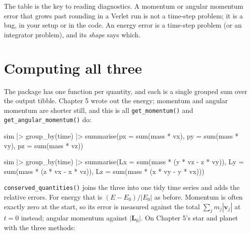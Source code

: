 \documentclass[
  10.5pt,
  letterpaper,
]{scrbook}
\newenvironment{Shaded}{\begin{snugshade}}{\end{snugshade}}
\newcommand{\AttributeTok}[1]{\textcolor[rgb]{0.00,0.00,0.00}{#1}}
\newcommand{\FunctionTok}[1]{\textcolor[rgb]{0.00,0.00,0.00}{#1}}
\newcommand{\NormalTok}[1]{\textcolor[rgb]{0.00,0.00,0.00}{#1}}
\newcommand{\SpecialCharTok}[1]{\textcolor[rgb]{0.00,0.00,0.00}{#1}}
\theoremstyle{definition}
\theoremstyle{plain}
\theoremstyle{remark}
\begin{document}
The table is the key to reading diagnostics. A momentum or angular
momentum error that grows past rounding in a Verlet run is not a
time-step problem; it is a bug, in your setup or in the code. An energy
error is a time-step problem (or an integrator problem), and its
\emph{shape} says which.

\section{Computing all three}\label{computing-all-three}

The package has one function per quantity, and each is a single grouped
sum over the output tibble. Chapter 5 wrote out the energy; momentum and
angular momentum are shorter still, and this is all
\texttt{get\_momentum()} and \texttt{get\_angular\_momentum()} do:

\begin{Shaded}
\begin{Highlighting}[]
\NormalTok{sim }\SpecialCharTok{|\textgreater{}}
  \FunctionTok{group\_by}\NormalTok{(time) }\SpecialCharTok{|\textgreater{}}
  \FunctionTok{summarise}\NormalTok{(}\AttributeTok{px =} \FunctionTok{sum}\NormalTok{(mass }\SpecialCharTok{*}\NormalTok{ vx), }\AttributeTok{py =} \FunctionTok{sum}\NormalTok{(mass }\SpecialCharTok{*}\NormalTok{ vy), }\AttributeTok{pz =} \FunctionTok{sum}\NormalTok{(mass }\SpecialCharTok{*}\NormalTok{ vz))}

\NormalTok{sim }\SpecialCharTok{|\textgreater{}}
  \FunctionTok{group\_by}\NormalTok{(time) }\SpecialCharTok{|\textgreater{}}
  \FunctionTok{summarise}\NormalTok{(}\AttributeTok{Lx =} \FunctionTok{sum}\NormalTok{(mass }\SpecialCharTok{*}\NormalTok{ (y }\SpecialCharTok{*}\NormalTok{ vz }\SpecialCharTok{{-}}\NormalTok{ z }\SpecialCharTok{*}\NormalTok{ vy)),}
            \AttributeTok{Ly =} \FunctionTok{sum}\NormalTok{(mass }\SpecialCharTok{*}\NormalTok{ (z }\SpecialCharTok{*}\NormalTok{ vx }\SpecialCharTok{{-}}\NormalTok{ x }\SpecialCharTok{*}\NormalTok{ vz)),}
            \AttributeTok{Lz =} \FunctionTok{sum}\NormalTok{(mass }\SpecialCharTok{*}\NormalTok{ (x }\SpecialCharTok{*}\NormalTok{ vy }\SpecialCharTok{{-}}\NormalTok{ y }\SpecialCharTok{*}\NormalTok{ vx)))}
\end{Highlighting}
\end{Shaded}

\texttt{conserved\_quantities()} joins the three into one tidy time
series and adds the relative errors. For energy that is
\((E - E_0)/|E_0|\) as before. Momentum is often exactly zero at the
start, so its error is measured against the total
\(\sum_j m_j|\mathbf{v}_j|\) at \(t = 0\) instead; angular momentum
against \(|\mathbf{L}_0|\). On Chapter 5's star and planet with the
three methods:
\end{document}
